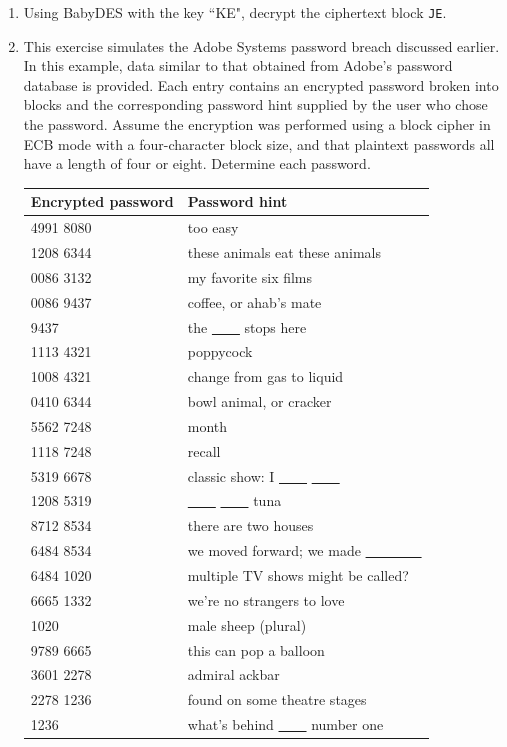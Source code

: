 \documentclass{book}
\theoremstyle{plain}
\theoremstyle{definition}
\newif\ifprintsolutions
\newcommand{\solution}[1]{\ifprintsolutions \begin{sloppypar}{\it #1}\end{sloppypar} \fi} %
\newcommand{\ciphertext}[1]{\texttt{#1}} %
\begin{document}
\begin{enumerate}
\item Using BabyDES with the key ``KE", decrypt the ciphertext block \ciphertext{JE}. \solution{The plaintext digraph is ``DL" after decryption.}
\item This exercise simulates the Adobe Systems password breach discussed earlier. In this example, data similar to that obtained from Adobe's password database is provided. Each entry contains an encrypted password broken into blocks and the corresponding password hint supplied by the user who chose the password. Assume the encryption was performed using a block cipher in ECB mode with a four-character block size, and that plaintext passwords all have a length of four or eight. Determine each password. \solution{password, cats fish, star wars, starbuck, buck, nonsense, condense, goldfish, december, remember, love lucy, cats love, congress, progress, programs, rickroll, rams, pinprick, itsa trap, trapdoor, door}

\begin{center}
\begin{tabular}{l|l}
Encrypted password & Password hint \\
\hline
4991 8080 & too easy \\
1208 6344 & these animals eat these animals \\
0086 3132 & my favorite six films \\
0086 9437 & coffee, or ahab's mate \\
9437 & the \underline{\ \ \ \ } stops here \\
1113 4321 & poppycock \\
1008 4321 & change from gas to liquid \\
0410 6344 & bowl animal, or cracker \\
5562 7248 & month \\
1118 7248 & recall \\
5319 6678 & classic show: I \underline{\ \ \ \ } \underline{\ \ \ \ } \\
1208 5319 & \underline{\ \ \ \ } \underline{\ \ \ \ } tuna \\
8712 8534 & there are two houses \\
6484 8534 & we moved forward; we made \underline{\ \ \ \ \ \ \ \ } \\
6484 1020 & multiple TV shows might be called? \\
6665 1332 & we're no strangers to love \\
1020 & male sheep (plural) \\
9789 6665 & this can pop a balloon \\
3601 2278 & admiral ackbar \\
2278 1236 & found on some theatre stages \\
1236 & what's behind \underline{\ \ \ \ } number one
\end{tabular}
\end{center}
\end{enumerate}
\end{document}
